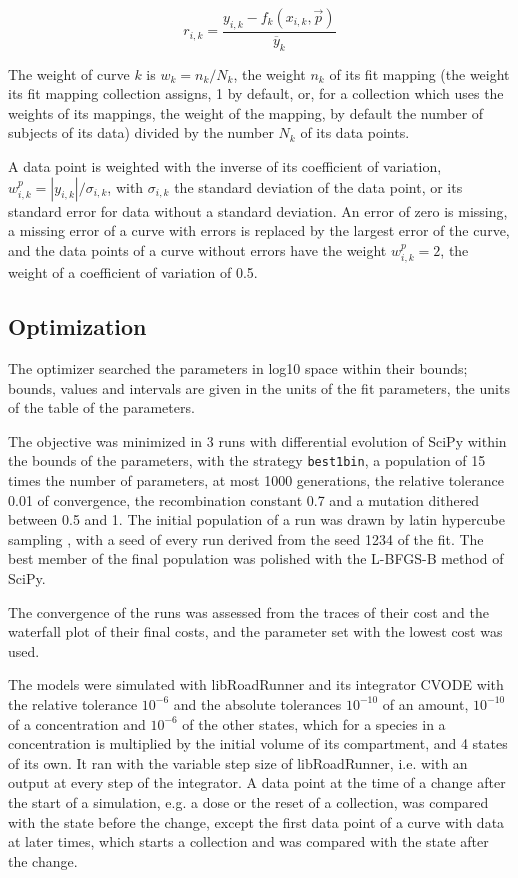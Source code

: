 \begin{equation}
r_{i,k} = \frac{y_{i,k} - f_k(x_{i,k}, \vec{p})}{\overline{y}_k}
\end{equation}

The weight of curve $k$ is $w_k = n_k / N_k$, the weight $n_k$ of its fit mapping (the weight its fit mapping collection assigns, 1 by default, or, for a collection which uses the weights of its mappings, the weight of the mapping, by default the number of subjects of its data) divided by the number $N_k$ of its data points.

A data point is weighted with the inverse of its coefficient of variation, $w^{p}_{i,k} = |y_{i,k}| / \sigma_{i,k}$, with $\sigma_{i,k}$ the standard deviation of the data point, or its standard error for data without a standard deviation. An error of zero is missing, a missing error of a curve with errors is replaced by the largest error of the curve, and the data points of a curve without errors have the weight $w^{p}_{i,k} = 2$, the weight of a coefficient of variation of 0.5.

\subsection{Optimization}

The optimizer searched the parameters in log10 space within their bounds; bounds, values and intervals are given in the units of the fit parameters, the units of the table of the parameters.

The objective was minimized in 3 runs with differential evolution \cite{Storn1997} of SciPy \cite{Virtanen2020} within the bounds of the parameters, with the strategy \texttt{best1bin}, a population of 15 times the number of parameters, at most 1000 generations, the relative tolerance 0.01 of convergence, the recombination constant 0.7 and a mutation dithered between 0.5 and 1. The initial population of a run was drawn by latin hypercube sampling \cite{McKay1979}, with a seed of every run derived from the seed 1234 of the fit. The best member of the final population was polished with the L-BFGS-B method of SciPy.

The convergence of the runs was assessed from the traces of their cost and the waterfall plot of their final costs, and the parameter set with the lowest cost was used.

The models were simulated with libRoadRunner \cite{Welsh2023} and its integrator CVODE \cite{Hindmarsh2005} with the relative tolerance $10^{-6}$ and the absolute tolerances $10^{-10}$ of an amount, $10^{-10}$ of a concentration and $10^{-6}$ of the other states, which for a species in a concentration is multiplied by the initial volume of its compartment, and 4 states of its own. It ran with the variable step size of libRoadRunner, i.e. with an output at every step of the integrator. A data point at the time of a change after the start of a simulation, e.g. a dose or the reset of a collection, was compared with the state before the change, except the first data point of a curve with data at later times, which starts a collection and was compared with the state after the change.

